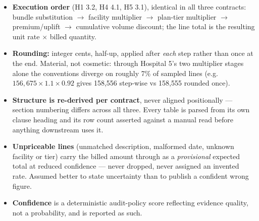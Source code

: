 \documentclass[10pt,a4paper]{article}
\begin{document}
\begin{itemize}
\item \textbf{Execution order} (H1 3.2, H4 4.1, H5 3.1), identical in all three contracts: bundle
substitution $\to$ facility multiplier $\to$ plan-tier multiplier $\to$ premium/uplift $\to$ cumulative
volume discount; the line total is the resulting unit rate $\times$ billed quantity.
\item \textbf{Rounding:} integer cents, half-up, applied after \emph{each} step rather than once at the end.
Material, not cosmetic: through Hospital 5's two multiplier stages alone the conventions diverge on roughly
7\% of sampled lines (e.g.\ $156{,}675\times1.1\times0.92$ gives 158{,}556 step-wise vs 158{,}555 rounded once).
\item \textbf{Structure is re-derived per contract}, never aligned positionally --- section numbering differs
across all three. Every table is parsed from its own clause heading and its row count asserted against a
manual read before anything downstream uses it.
\item \textbf{Unpriceable lines} (unmatched description, malformed date, unknown facility or tier) carry the
billed amount through as a \emph{provisional} expected total at reduced confidence --- never dropped, never
assigned an invented rate. Assumed better to state uncertainty than to publish a confident wrong figure.
\item \textbf{Confidence} is a deterministic audit-policy score reflecting evidence quality, not a
probability, and is reported as such.
\end{itemize}

\vspace{-3pt}
\end{document}
